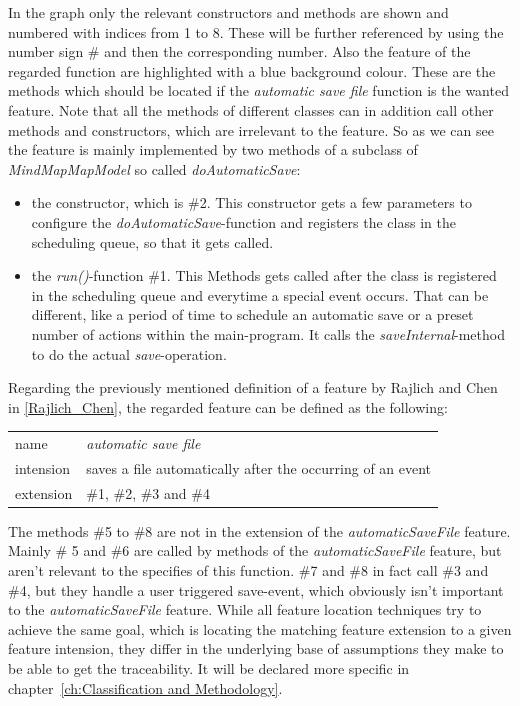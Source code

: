 In the graph only the relevant constructors and methods are shown and numbered with indices from 1 to 8. These will be further referenced by using the number sign \# and then the corresponding number. Also the feature of the regarded function are highlighted with a blue background colour. These are the methods which should be located if the \emph{automatic save file} function is the wanted feature. Note that all the methods of different classes can in addition call other methods and constructors, which are irrelevant to the feature.
So as we can see the feature is mainly implemented by two methods of a subclass of \emph{MindMapMapModel} so called \emph{doAutomaticSave}:
\begin{itemize} 
\item the constructor, which is \#2. This constructor gets a few parameters to configure the \emph{doAutomaticSave}-function and registers the class in the scheduling queue, so that it gets called.
\item the \emph{run()}-function \#1. This Methods gets called after the class is registered in the scheduling queue and everytime a special event occurs. That can be different, like a period of time to schedule an automatic save or a preset number of actions within the main-program. It calls the \emph{saveInternal}-method to do the actual \textit{save}-operation.
\end{itemize}

\newpage
Regarding the previously mentioned definition of a feature by Rajlich and Chen in \autoref{Rajlich_Chen}, the regarded feature can be defined as the following: \newline
\begin{tabular}{ l  l }
  name & \emph{automatic save file}  \\
  intension & saves a file automatically after the occurring of an event\\
 extension & \#1,  \#2, \#3 and \#4\\
\end{tabular}
The methods \#5 to \#8 are not in the extension of the \emph{automaticSaveFile} feature.
Mainly \# 5 and \#6 are called by methods of the \emph{automaticSaveFile} feature, but aren't relevant to the specifies of this function.
\#7 and \#8 in fact call \#3 and \#4, but they handle a user triggered save-event, which obviously isn't important to the \emph{automaticSaveFile} feature.
\newline \newline
While all feature location techniques try to achieve the same goal, which is locating the matching feature extension to a given feature intension, they differ in the underlying base of assumptions they make to be able to get the traceability. It will be declared more specific in chapter~\ref{ch:Classification and Methodology}. 
